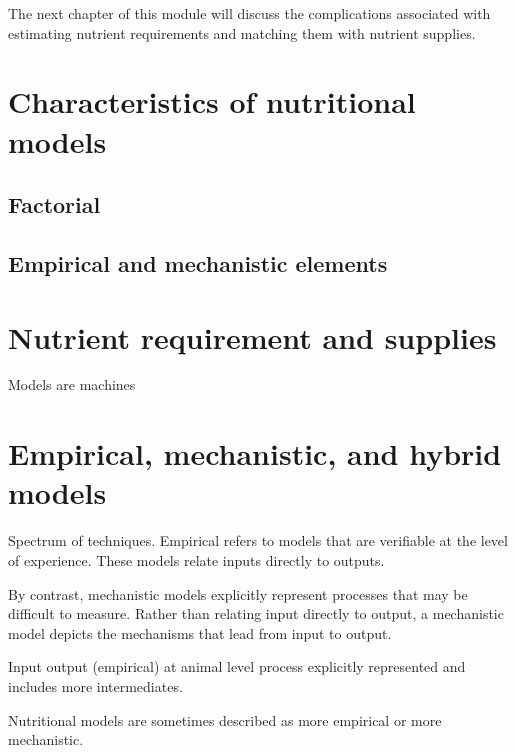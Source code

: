 \documentclass[
]{book}
\begin{document}
The next chapter of this module will discuss the complications associated with estimating nutrient requirements and matching them with nutrient supplies.

\hypertarget{characteristics-of-nutritional-models}{%
\section{Characteristics of nutritional models}\label{characteristics-of-nutritional-models}}

\hypertarget{factorial}{%
\subsection{Factorial}\label{factorial}}

\hypertarget{empirical-and-mechanistic-elements}{%
\subsection{Empirical and mechanistic elements}\label{empirical-and-mechanistic-elements}}

\hypertarget{nutrient-requirement-and-supplies}{%
\section{Nutrient requirement and supplies}\label{nutrient-requirement-and-supplies}}

Models are machines

\hypertarget{empirical-mechanistic-and-hybrid-models}{%
\section{Empirical, mechanistic, and hybrid models}\label{empirical-mechanistic-and-hybrid-models}}

Spectrum of techniques.
Empirical refers to models that are verifiable at the level of experience. These models relate inputs directly to outputs.

By contrast, mechanistic models explicitly represent processes that may be difficult to measure. Rather than relating input directly to output, a mechanistic model depicts the mechanisms that lead from input to output.

Input output (empirical) at animal level
process explicitly represented and includes more intermediates.

Nutritional models are sometimes described as more empirical or more mechanistic.
\end{document}

